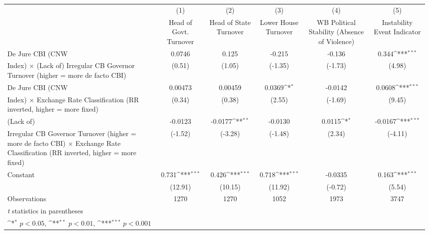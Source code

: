 {
\def\sym#1{\ifmmode^{#1}\else\(^{#1}\)\fi}
\begin{tabular}{l*{5}{c}}
\toprule
                &\multicolumn{1}{c}{(1)}&\multicolumn{1}{c}{(2)}&\multicolumn{1}{c}{(3)}&\multicolumn{1}{c}{(4)}&\multicolumn{1}{c}{(5)}\\
                &\multicolumn{1}{c}{Head of Govt. Turnover}&\multicolumn{1}{c}{Head of State Turnover}&\multicolumn{1}{c}{Lower House Turnover}&\multicolumn{1}{c}{WB Political Stability (Absence of Violence)}&\multicolumn{1}{c}{Instability Event Indicator}\\
\midrule
De Jure CBI (CNW&   0.0746         &    0.125         &   -0.215         &   -0.136         &    0.344\sym{***}\\
Index) $\times$ (Lack of) Irregular CB Governor Turnover (higher = more de facto CBI)&   (0.51)         &   (1.05)         &  (-1.35)         &  (-1.73)         &   (4.98)         \\
\addlinespace
De Jure CBI (CNW&  0.00473         &  0.00459         &   0.0369\sym{*}  &  -0.0142         &   0.0608\sym{***}\\
Index) $\times$ Exchange Rate Classification (RR inverted, higher = more fixed)&   (0.34)         &   (0.38)         &   (2.55)         &  (-1.69)         &   (9.45)         \\
\addlinespace
(Lack of)       &  -0.0123         &  -0.0177\sym{**} &  -0.0130         &   0.0115\sym{*}  &  -0.0167\sym{***}\\
Irregular CB Governor Turnover (higher = more de facto CBI) $\times$ Exchange Rate Classification (RR inverted, higher = more fixed)&  (-1.52)         &  (-3.28)         &  (-1.48)         &   (2.34)         &  (-4.11)         \\
\addlinespace
Constant        &    0.731\sym{***}&    0.426\sym{***}&    0.718\sym{***}&  -0.0335         &    0.163\sym{***}\\
                &  (12.91)         &  (10.15)         &  (11.92)         &  (-0.72)         &   (5.54)         \\
\midrule
Observations    &     1270         &     1270         &     1052         &     1973         &     3747         \\
\bottomrule
\multicolumn{6}{l}{\footnotesize \textit{t} statistics in parentheses}\\
\multicolumn{6}{l}{\footnotesize \sym{*} \(p<0.05\), \sym{**} \(p<0.01\), \sym{***} \(p<0.001\)}\\
\end{tabular}
}
